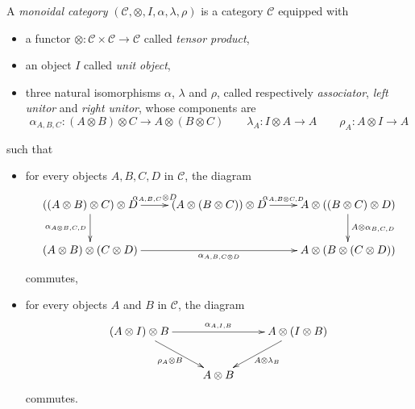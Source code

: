 \begin{definition}\label{monoidalcategory}
A \emph{monoidal category} $(\mathcal{C},\otimes,I,\alpha,\lambda,\rho)$ is a category $\mathcal{C}$ equipped with
\begin{itemize}
\item a functor $\otimes:\mathcal{C}\times\mathcal{C}\to\mathcal{C}$ called \emph{tensor product},
\item an object $I$ called \emph{unit object},
\item three natural isomorphisms $\alpha$, $\lambda$ and $\rho$, called respectively \emph{associator}, \emph{left unitor} and \emph{right unitor}, whose components are
\begin{equation*}
\alpha_{A,B,C}:(A\otimes B)\otimes C\to A\otimes (B\otimes C)
\qquad
\lambda_A:I\otimes A\to A
\qquad
\rho_A:A\otimes I\to A
\end{equation*}
\end{itemize}
such that
\begin{itemize}
\item for every objects $A,B,C,D$ in $\mathcal{C}$, the diagram
\begin{equation*}
\xymatrix{
    ((A\otimes B)\otimes C)\otimes D\ar[d]_{\alpha_{A\otimes B,C,D}}\ar[r]^{\alpha_{A,B,C}\otimes D}& (A\otimes(B\otimes C))\otimes D\ar[r]^{\alpha_{A,B\otimes C,D}}& A\otimes((B\otimes C)\otimes D)\ar[d]^{A\otimes\alpha_{B,C,D}}\\
    (A\otimes B)\otimes(C\otimes D)\ar[rr]_{\alpha_{A,B,C\otimes D}}& & A\otimes(B\otimes (C\otimes D))
}
\end{equation*}
commutes,
\item for every objects $A$ and $B$ in $\mathcal{C}$, the diagram
\begin{equation*}
\xymatrix{
    (A\otimes I)\otimes B\ar[dr]_{\rho_A\otimes B}\ar[rr]^{\alpha_{A,I,B}}& & \ar[dl]^{A\otimes\lambda_B}A\otimes(I\otimes B)\\
    & A\otimes B& 
}
\end{equation*}
commutes.
\end{itemize}
\end{definition}

